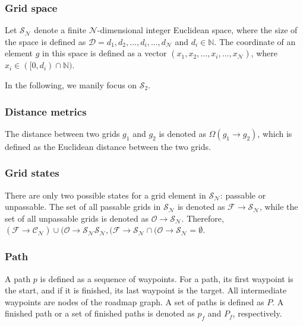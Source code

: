 \documentclass[letterpaper, 10 pt, journal, twoside]{IEEEtran}
\begin{document}
\subsubsection{Grid space}

Let $\mathcal{S}_{\mathcal{N}}$ denote a finite $\mathcal{N}$-dimensional integer Euclidean space, where the size of the space is defined as $\mathcal{D}={d_{1}, d_{2},...,d_{i},...,d_\mathcal{N}}$ and $d_{i} \in \mathbb{N}$. The coordinate of an element $\textit{g}$ in this space is defined as a vector $(x_1,x_2,...,x_i,...,x_{\mathcal{N}})$, where $x_i \in ([0,d_i) \cap \mathbb{N})$. 

In the following, we manily focus on $\mathcal{S}_{2}$.

\subsubsection{Distance metrics}

The distance between two grids ${\textit{g}}_{1}$ and $\textit{g}_{2}$ is denoted as $\Omega({\textit{g}}_{1} \rightarrow \textit{g}_{2})$, which is defined as the Euclidean distance between the two grids.

\subsubsection{Grid states}

There are only two possible states for a grid element in $\mathcal{S}_{\mathcal{N}}$: passable or unpassable. The set of all passable grids in $\mathcal{S}_{\mathcal{N}}$ is denoted as $\mathcal{F} \rightarrow \mathcal{S}_{\mathcal{N}}$, while the set of all unpassable grids is denoted as $\mathcal{O} \rightarrow \mathcal{S}_{\mathcal{N}}$. Therefore, $(\mathcal{F} \rightarrow \mathcal{C}_{\mathcal{N}}) \cup (\mathcal{O} \rightarrow \mathcal{S}_{\mathcal{N}} \mathcal{S}_{\mathcal{N}}, (\mathcal{F} \rightarrow \mathcal{S}_{\mathcal{N}} \cap (\mathcal{O} \rightarrow \mathcal{S}_{\mathcal{N}} = \emptyset$. 


\subsubsection{Path} 

A path $p$ is defined as a sequence of waypoints. For a path, its first waypoint is the start, and if it is finished, its last waypoint is the target. All intermediate waypoints are nodes of the roadmap graph. A set of paths is defined as $P$. A finished path or a set of finished paths is denoted as $p_f$ and $P_f$, respectively.
\end{document}
